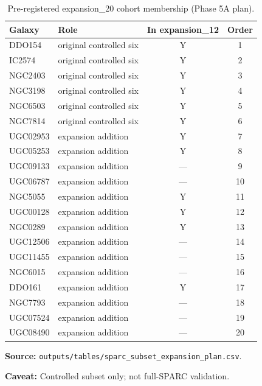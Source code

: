 \begin{table}[htbp]
\centering
\caption{Pre-registered expansion\_20 cohort membership (Phase 5A plan).}
\label{tab:cohort}
\footnotesize
\begin{tabular}{llcc}
\toprule
Galaxy & Role & In expansion\_12 & Order \\
\midrule
DDO154 & original controlled six & Y & 1 \\
IC2574 & original controlled six & Y & 2 \\
NGC2403 & original controlled six & Y & 3 \\
NGC3198 & original controlled six & Y & 4 \\
NGC6503 & original controlled six & Y & 5 \\
NGC7814 & original controlled six & Y & 6 \\
UGC02953 & expansion addition & Y & 7 \\
UGC05253 & expansion addition & Y & 8 \\
UGC09133 & expansion addition & --- & 9 \\
UGC06787 & expansion addition & --- & 10 \\
NGC5055 & expansion addition & Y & 11 \\
UGC00128 & expansion addition & Y & 12 \\
NGC0289 & expansion addition & Y & 13 \\
UGC12506 & expansion addition & --- & 14 \\
UGC11455 & expansion addition & --- & 15 \\
NGC6015 & expansion addition & --- & 16 \\
DDO161 & expansion addition & Y & 17 \\
NGC7793 & expansion addition & --- & 18 \\
UGC07524 & expansion addition & --- & 19 \\
UGC08490 & expansion addition & --- & 20 \\
\bottomrule
\end{tabular}
\vspace{0.4em}
{\footnotesize
\par\noindent\textbf{Source:} \texttt{outputs/tables/sparc\_subset\_expansion\_plan.csv}.
\par\noindent\textbf{Caveat:} Controlled subset only; not full-SPARC validation.
\par
}
\end{table}

